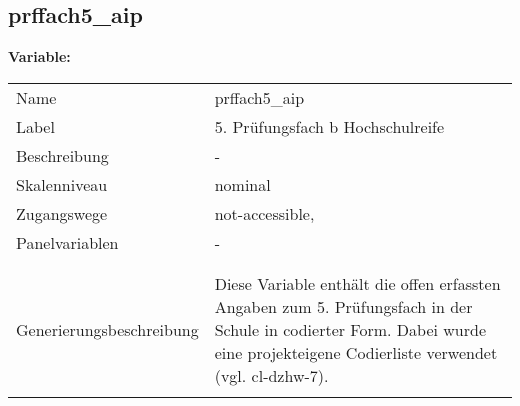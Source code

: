 	
	
	\subsection{prffach5\_aip}
	\label{subSection:prffach5_aip}

	\noindent\textbf{Variable:}\\
		\begin{tabular}{lL{11.3cm}}
			\label{tableVariable:prffach5_aip}
			Name & prffach5\_aip \\
			Label & 5. Prüfungsfach b Hochschulreife \\
			Beschreibung & - \\
			Skalenniveau & nominal \\
			Zugangswege &
				not-accessible,
 \\
			Panelvariablen & -
			 \\
			 \\
 \\
					Generierungsbeschreibung & Diese Variable enthält die offen erfassten Angaben zum 5. Prüfungsfach in der Schule in codierter Form. Dabei wurde eine projekteigene Codierliste verwendet (vgl. cl-dzhw-7).
				 \\	
			 \\
		\end{tabular}






	
	\newpage
